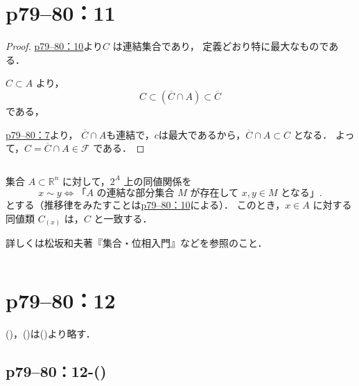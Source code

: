 \section*{p79--80：11} \label{p79--80：11}

\begin{leftbar}
    \begin{proof}
        \hyperref[p79--80：10]{p79--80：10}より$C$ は連結集合であり，
        定義どおり特に最大なものである．

        $C \subset A$ より，
        \[
            C \subset (\overline{C} \cap A) \subset \overline{C}
        \]
        である，

        \hyperref[p79--80：7]{p79--80：7}より，
        $\overline{C} \cap A$も連結で，$c$は最大であるから，$\overline{C} \cap A \subset C$ となる．
        よって，$ C = \overline{C} \cap A \in \mathcal{F}$ である．
    \end{proof}
\end{leftbar}

\begin{column}
    集合 $A \subset \mathbb{R}^n$ に対して，$2^A$ 上の同値関係を
    \[
        x \sim y　\iff \text{「$A$ の連結な部分集合 $M$ が存在して $x, y \in M$ となる」}.
    \]
    とする（推移律をみたすことは\hyperref[p79--80：10]{p79--80：10}による）．
    このとき，$x \in A$ に対する同値類 $C_{(x)}$ は，$C$ と一致する．

    詳しくは松坂和夫著『集合・位相入門』などを参照のこと．
\end{column}


\section*{p79--80：12} \label{p79--80：12}

()，()は()より略す．


\subsection*{p79--80：12-()} \label{p79--80：12-(\romannumeral3)}


